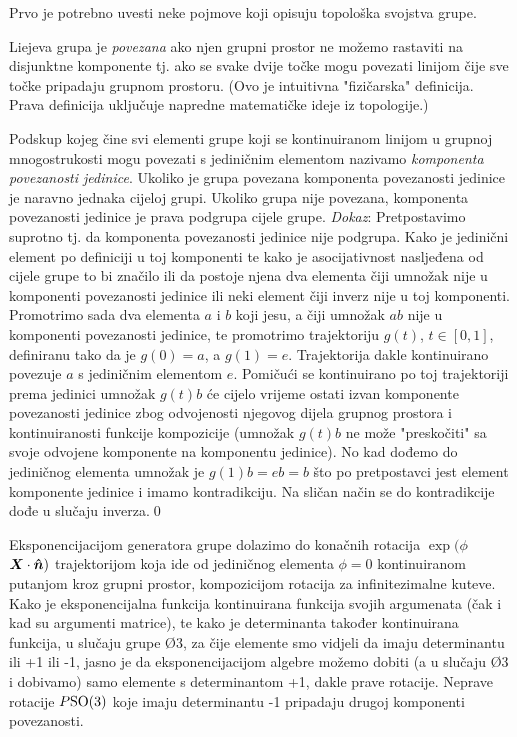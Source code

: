 Prvo je potrebno uvesti neke pojmove koji opisuju topološka
svojstva grupe.
\begin{definicija}[Povezanost]
Liejeva grupa je \emph{povezana} ako njen grupni prostor ne možemo
rastaviti na disjunktne komponente tj. ako se svake dvije točke 
mogu povezati linijom čije sve točke pripadaju grupnom prostoru.
(Ovo je intuitivna "fizičarska" definicija. Prava definicija uključuje napredne
matematičke ideje iz topologije.)
\label{def:povezanost}
\end{definicija}
Podskup kojeg čine svi elementi grupe koji se
kontinuiranom linijom u grupnoj mnogostrukosti mogu povezati s
jediničnim elementom nazivamo \emph{komponenta povezanosti jedinice}.
Ukoliko je grupa povezana komponenta povezanosti jedinice je naravno
jednaka cijeloj grupi. Ukoliko grupa nije povezana, komponenta povezanosti
jedinice je prava podgrupa cijele grupe. \emph{Dokaz}: Pretpostavimo
suprotno tj. da komponenta povezanosti jedinice nije podgrupa. Kako je
jedinični element po definiciji u toj komponenti te kako je asocijativnost
nasljeđena od cijele grupe to bi značilo ili da postoje njena dva elementa čiji
umnožak nije u komponenti povezanosti jedinice ili neki element čiji inverz nije u 
toj komponenti.
Promotrimo sada dva elementa $a$ i $b$ koji jesu, a čiji umnožak $ab$ nije u komponenti
povezanosti jedinice, te promotrimo trajektoriju $g(t)$, $t\in[0,1]$,
definiranu tako da je $g(0)=a$, a $g(1)=e$. Trajektorija dakle
kontinuirano povezuje $a$ s jediničnim elementom $e$.
Pomičući se kontinuirano po toj trajektoriji prema jedinici
umnožak $g(t)b$ će cijelo vrijeme ostati izvan komponente povezanosti jedinice
zbog odvojenosti njegovog dijela grupnog prostora i kontinuiranosti
funkcije kompozicije (umnožak $g(t)b$ ne može "preskočiti" sa svoje odvojene
komponente na komponentu jedinice). No kad dođemo do jediničnog elementa
umnožak je $g(1)b = eb = b$ što po pretpostavci jest element komponente jedinice
i imamo kontradikciju. Na sličan način se do kontradikcije dođe u slučaju inverza.\qed

Eksponencijacijom generatora grupe  dolazimo do konačnih rotacija
$\exp(\phi$ $\vec{X}\cdot\unitn)$ trajektorijom koja ide od jediničnog
elementa $\phi=0$ kontinuiranom putanjom kroz grupni prostor, kompozicijom rotacija za
infinitezimalne kuteve. Kako je eksponencijalna funkcija kontinuirana
funkcija svojih argumenata (čak i kad su argumenti matrice), te kako
je determinanta također kontinuirana funkcija, u slučaju grupe \O{3},
za čije elemente smo vidjeli da imaju determinantu ili +1 ili -1,
jasno je da eksponencijacijom algebre možemo dobiti (a u slučaju \O{3}
i dobivamo) samo elemente s determinantom +1, dakle prave rotacije.
Neprave rotacije $P\mathrm{SO}(3)$ koje imaju determinantu -1
pripadaju drugoj komponenti povezanosti. \label{pag:povezanostO3}



